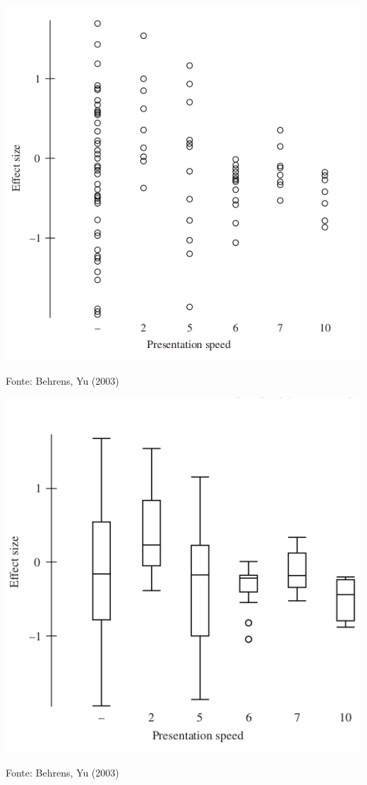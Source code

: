 \documentclass{beamer}
\begin{document}
\begin{frame}
  \begin{center}
    \includegraphics[height=0.7\textheight]{EDA/eda-boxplot1}
  \end{center}
  Fonte: Behrens, Yu (2003)
\end{frame}

\begin{frame}
  \begin{center}
    \includegraphics[height=0.7\textheight]{EDA/eda-boxplot2}
  \end{center}
  Fonte: Behrens, Yu (2003)
\end{frame}
\end{document}
